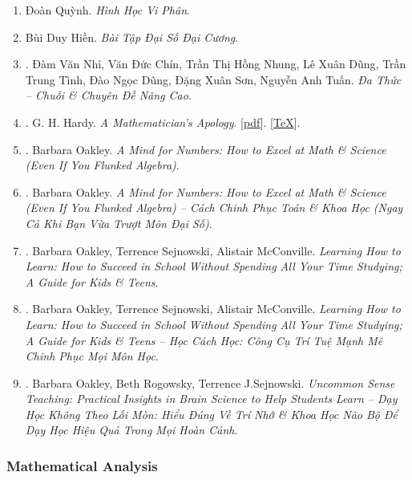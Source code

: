 \documentclass{article}
\begin{document}
\begin{enumerate}
	\item Đoàn Quỳnh. \textit{Hình Học Vi Phân}.
	\item Bùi Duy Hiền. \textit{Bài Tập Đại Số Đại Cương}.
	\item \cite{Nhi_Chin_Dung_Dung_Tinh_Dung_Son_Tuan2017}. Đàm Văn Nhỉ, Văn Đức Chín, Trần Thị Hồng Nhung, Lê Xuân Dũng, Trần Trung Tình, Đào Ngọc Dũng, Đặng Xuân Sơn, Nguyễn Anh Tuấn. \textit{Đa Thức -- Chuỗi \& Chuyên Đề Nâng Cao}.
	\item \cite{Hardy1940, Hardy1992, Hardy2022}. G. H. Hardy. \textit{A Mathematician's Apology}. [\href{https://github.com/NQBH/hobby/blob/master/advanced_mathematics/Hardy2017/NQBH_Hardy2017.pdf}{pdf}]. [\href{https://github.com/NQBH/hobby/blob/master/advanced_mathematics/Hardy2017/NQBH_Hardy2017.tex}{\TeX}].\hfill{\sf[done]}
	\item \cite{Oakley2014}. Barbara Oakley. \textit{A Mind for Numbers: How to Excel at Math \& Science (Even If You Flunked Algebra)}.\hfill{\sf[reading]}
	\item \cite{Oakley_mind_number}. Barbara Oakley. \textit{A Mind for Numbers: How to Excel at Math \& Science (Even If You Flunked Algebra) -- Cách Chinh Phục Toán \& Khoa Học (Ngay Cả Khi Bạn Vừa Trượt Môn Đại Số)}.\hfill{\sf[done]}
	\item \cite{Oakley_Sejnowski_McConville2018}. Barbara Oakley, Terrence Sejnowski, Alistair McConville. \textit{Learning How to Learn: How to Succeed in School Without Spending All Your Time Studying; A Guide for Kids \& Teens}.\hfill{\sf[reading]}
	\item \cite{Oakley_Sejnowski_McConville_learn_how_learn}. Barbara Oakley, Terrence Sejnowski, Alistair McConville. \textit{Learning How to Learn: How to Succeed in School Without Spending All Your Time Studying; A Guide for Kids \& Teens -- Học Cách Học: Công Cụ Trí Tuệ Mạnh Mẽ Chinh Phục Mọi Môn Học}.\hfill{\sf[done]}
	\item \cite{Oakley_Rogowsky_Sejnowski_McConville_uncommon_sense_teaching}. Barbara Oakley, Beth Rogowsky, Terrence J.Sejnowski. \textit{Uncommon Sense Teaching: Practical Insights in Brain Science to Help Students Learn -- Dạy Học Không Theo Lối Mòn: Hiểu Đúng Về Trí Nhớ \& Khoa Học Não Bộ Để Dạy Học Hiệu Quả Trong Mọi Hoàn Cảnh}.\hfill{\sf[reading]}
\end{enumerate}

\subsubsection{Mathematical Analysis}
\end{document}
